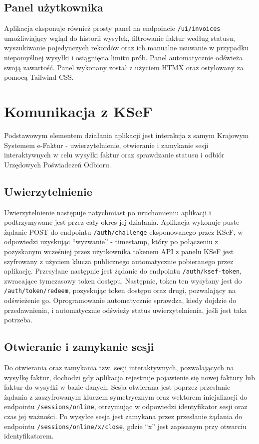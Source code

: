 \subsection{Panel użytkownika}
Aplikacja eksponuje również prosty panel na endpoincie \texttt{/ui/invoices} umożliwiający wgląd do historii wysyłek, filtrowanie faktur według statusu, wyszukiwanie pojedynczych rekordów oraz ich manualne usuwanie w przypadku niepomyślnej wysyłki i osiągnięcia limitu prób. Panel automatycznie odświeża swoją zawartość. Panel wykonany został z użyciem HTMX %
    oraz ostylowany za pomocą Tailwind CSS.

\section{Komunikacja z KSeF}
Podstawowym elementem działania aplikacji jest interakcja z samym Krajowym Systemem e-Faktur - uwierzytelnienie, otwieranie i zamykanie sesji interaktywnych w celu wysyłki faktur oraz sprawdzanie statusu i odbiór Urzędowych Poświadczeń Odbioru. 

\subsection{Uwierzytelnienie}
Uwierzytelnienie następuje natychmiast po uruchomieniu aplikacji i podtrzymywane jest przez cały okres jej działania. Aplikacja wykonuje puste żądanie POST do endpointu \texttt{/auth/challenge} eksponowanego przez KSeF, w odpowiedzi uzyskując \enquote{wyzwanie} - timestamp, który po połączeniu z pozyskanym wcześniej przez użytkownika tokenem API z panelu KSeF jest szyfrowany z użyciem klucza publicznego automatycznie pobieranego przez aplikację. Przesyłane następnie jest żądanie do endpointu \texttt{/auth/ksef-token}, zwracające tymczasowy token dostępu. Następnie, token ten wysyłany jest do \texttt{/auth/token/redeem}, pozyskując token dostępu oraz drugi, pozwalający na odświeżenie go. Oprogramowanie automatycznie sprawdza, kiedy dojdzie do przedawnienia, i automatycznie odświeży status uwierzytelnienia, jeśli jest taka potrzeba.

\subsection{Otwieranie i zamykanie sesji}
Do otwierania oraz zamykania tzw. sesji interaktywnych, pozwalających na wysyłkę faktur, dochodzi gdy aplikacja rejestruje pojawienie się nowej faktury lub faktur do wysyłki w bazie danych. Sesja otwierana jest poprzez przesłanie żądania z zaszyfrowanym kluczem symetrycznym oraz wektorem inicjalizacji do endpointu \texttt{/sessions/online}, otrzymując w odpowiedzi identyfikator sesji oraz czas jej ważności. Po wysyłce sesja jest zamykana przez przesłanie żądania do endpointu \texttt{/sessions/online/x/close}, gdzie \enquote{x} jest zapisanym przy otwarciu identyfikatorem.

